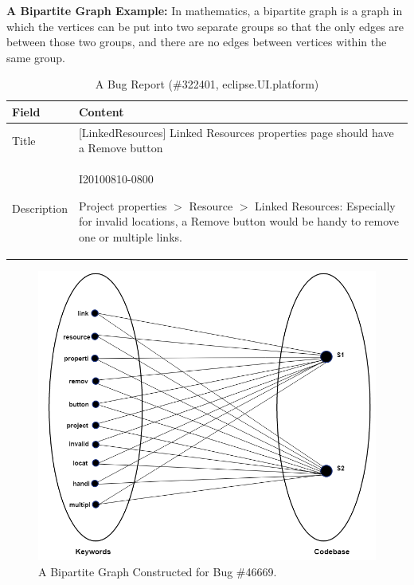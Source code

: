 \documentclass[conference]{IEEEtran}
\begin{document}
\textbf{A Bipartite Graph Example:} In mathematics, a bipartite graph is a graph in which the vertices can be put into two separate groups so that the only edges are between those two groups, and there are no edges between vertices within the same group. 
\begin{table}[htbp]
	\caption{A Bug Report (\#322401, eclipse.UI.platform)}
	\label{tab:BugInfo2}
	\begin{center}
		\begin{tabular}{ p{1.5cm} | p{6cm}}
			\hline
			\textbf{Field}  & \textbf{Content} \\
			\hline
			\hline Title &
		[LinkedResources] Linked Resources properties page should have a Remove button
			\\ \hline
		   Description &  I20100810-0800
		   
		   Project properties $>$ Resource $>$ Linked Resources:
		   Especially for invalid locations, a Remove button would be handy to remove one or multiple links. \\
			\hline
		\end{tabular}
	\end{center}
\end{table}
\begin{figure}
	\centering
	\includegraphics[scale=0.53]{BGraph2}
	\caption{A Bipartite Graph Constructed for Bug \#46669. 
	}
	\label{fig:BipartiteGraph}
\end{figure}
\end{document}
